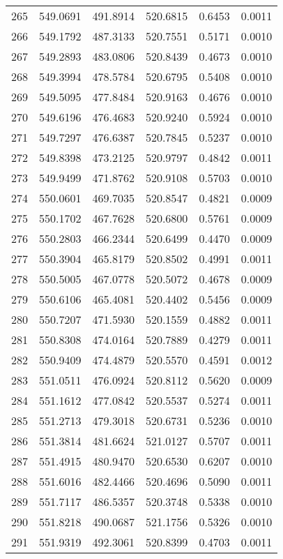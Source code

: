 \documentclass{article}
\begin{document}
\begin{longtable}{|c|c|c|c|c|c|}
265 & 549.0691 & 491.8914 & 520.6815 & 0.6453 & 0.0011 \\
266 & 549.1792 & 487.3133 & 520.7551 & 0.5171 & 0.0010 \\
267 & 549.2893 & 483.0806 & 520.8439 & 0.4673 & 0.0010 \\
268 & 549.3994 & 478.5784 & 520.6795 & 0.5408 & 0.0010 \\
269 & 549.5095 & 477.8484 & 520.9163 & 0.4676 & 0.0010 \\
270 & 549.6196 & 476.4683 & 520.9240 & 0.5924 & 0.0010 \\
271 & 549.7297 & 476.6387 & 520.7845 & 0.5237 & 0.0010 \\
272 & 549.8398 & 473.2125 & 520.9797 & 0.4842 & 0.0011 \\
273 & 549.9499 & 471.8762 & 520.9108 & 0.5703 & 0.0010 \\
274 & 550.0601 & 469.7035 & 520.8547 & 0.4821 & 0.0009 \\
275 & 550.1702 & 467.7628 & 520.6800 & 0.5761 & 0.0009 \\
276 & 550.2803 & 466.2344 & 520.6499 & 0.4470 & 0.0009 \\
277 & 550.3904 & 465.8179 & 520.8502 & 0.4991 & 0.0011 \\
278 & 550.5005 & 467.0778 & 520.5072 & 0.4678 & 0.0009 \\
279 & 550.6106 & 465.4081 & 520.4402 & 0.5456 & 0.0009 \\
280 & 550.7207 & 471.5930 & 520.1559 & 0.4882 & 0.0011 \\
281 & 550.8308 & 474.0164 & 520.7889 & 0.4279 & 0.0011 \\
282 & 550.9409 & 474.4879 & 520.5570 & 0.4591 & 0.0012 \\
283 & 551.0511 & 476.0924 & 520.8112 & 0.5620 & 0.0009 \\
284 & 551.1612 & 477.0842 & 520.5537 & 0.5274 & 0.0011 \\
285 & 551.2713 & 479.3018 & 520.6731 & 0.5236 & 0.0010 \\
286 & 551.3814 & 481.6624 & 521.0127 & 0.5707 & 0.0011 \\
287 & 551.4915 & 480.9470 & 520.6530 & 0.6207 & 0.0010 \\
288 & 551.6016 & 482.4466 & 520.4696 & 0.5090 & 0.0011 \\
289 & 551.7117 & 486.5357 & 520.3748 & 0.5338 & 0.0010 \\
290 & 551.8218 & 490.0687 & 521.1756 & 0.5326 & 0.0010 \\
291 & 551.9319 & 492.3061 & 520.8399 & 0.4703 & 0.0011 \\

\end{longtable}
\end{document}
